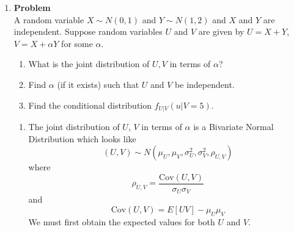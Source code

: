\documentclass[12pt]{article}
\newenvironment{Ex}{\textbf{Problem}\vspace{.75em}\\}{}
\begin{document}
\begin{enumerate}
\begin{Ex}
\begin{solution}
\begin{enumerate}
\begin{equation}
\begin{aligned}
            &= \text{Var}(M_1 + \cdots + M_n) \\
            &= n\text{Var}(M) \\
            &= \left(\frac{q}{1-p}\right)
            \left(\frac{1}{\lambda^2}\right) \\
            \implies \text{Var}(Y|N=n) &= \frac{q}{(1-p)\labda^2} \\
          \end{aligned}
        \end{equation}
      \end{enumerate}
    \end{solution}
  \end{Ex}
\item
  \begin{Ex}
    A random variable $X \sim N(0,1)$ and $Y \sim N(1,2)$ and $X$ and
    $Y$ are independent. Suppose random variables $U$ and $V$ are
    given by $U=X+Y$, $V=X+\alpha Y$ for some $\alpha$.
    \begin{enumerate}
    \item What is the joint distribution of $U,V$ in terms of
      $\alpha$?
    \item Find $\alpha$ (if it exists) such that $U$ and $V$ be
      independent.
    \item Find the conditional distribution $f_{U|V}(u|V = 5)$.
    \end{enumerate}
    \begin{solution} \hfill
      \begin{enumerate}
      \item The joint distribution of $U$, $V$ in terms of $\alpha$ is
        a Bivariate Normal Distribution which looks like
        \begin{equation}
          \label{eq:5a-biv-decl}
          (U,V) \sim N(\mu_U, \mu_V, \sigma_U^2, \sigma_V^2, \rho_{U,V})
        \end{equation}
        where
        \begin{equation}
          \label{eq:5a-rho-decl}
          \rho_{U,V} = \frac{\text{Cov}(U,V)}{\sigma_U \sigma_V}
        \end{equation}
        and
        \begin{equation}
          \label{eq:5a-cov-decl}
          \text{Cov}(U,V) = E[UV]-\mu_U \mu_V
        \end{equation}
        We must first obtain the expected values for both $U$ and
        $V$. \\
        \begin{tabularx}{.95\textwidth}{XX}

\end{tabularx}
\end{enumerate}
\end{solution}
\end{Ex}
\end{enumerate}
\end{document}
